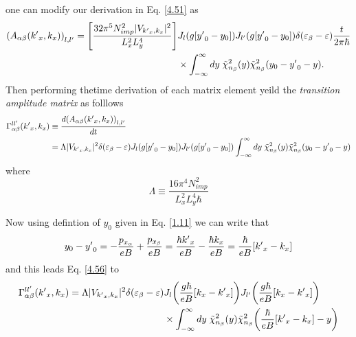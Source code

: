 one can modify our derivation in Eq. \eqref{4.51} as
\begin{equation} \label{4.54}
  \begin{aligned}
      \qty(A_{\alpha\beta}({k'}_x,k_x))_{l,l'} =
      \qty[\frac { 32\pi^5 N_{imp}^2 |V_{{k'}_x,k_x}|^2}{L_x^2 L_y^4}] &
      J_l\qty(g[{y'}_0 - y_0]) J_{l'}\qty(g[{y'}_0 - y_0])
      \delta(\varepsilon_{\beta} - \varepsilon)
      \frac{t}{2\pi \hbar}\\
      & \times
      \int_{-\infty}^{\infty} dy \;
      \tilde{\chi}^2_{n_{\beta}}\qty(y)
      \tilde{\chi}^2_{n_{\beta}}\qty(y_0 - {y'}_0 - y).
  \end{aligned}
\end{equation}
Then performing thetime derivation of each matrix element yeild the \textit{transition amplitude matrix} as folllows
\begin{equation} \label{4.55}
  \begin{aligned}
    \Gamma_{\alpha\beta}^{ll'}({k'}_x,k_x) &  \equiv
    \frac{d \qty(A_{\alpha\beta}({k'}_x,k_x))_{l,l'}}{dt} \\
    & =
    \Lambda |V_{{k'}_x,k_x}|^2
    \delta(\varepsilon_{\beta} - \varepsilon)
    J_l\qty(g[{y'}_0 - y_0]) J_{l'}\qty(g[{y'}_0 - y_0])
    \int_{-\infty}^{\infty} dy \;
    \tilde{\chi}^2_{n_{\beta}}\qty(y)
    \tilde{\chi}^2_{n_{\beta}}\qty(y_0 - {y'}_0 - y)
  \end{aligned}
\end{equation}
where
\begin{equation} \label{4.56}
    \Lambda \equiv
    \frac { 16\pi^4 N_{imp}^2}{L_x^2 L_y^4 \hbar}
\end{equation}

\noindent
Now using defintion of $y_0$ given in Eq. \eqref{1.11} we can write that
\begin{equation} \label{4.57}
    y_0 - {y'}_0 =
    - \frac{p_{x_{\alpha}}}{eB} + \frac{p_{x_{\beta}}}{eB} =
    \frac{\hbar {k'}_x}{eB} - \frac{\hbar {k}_x}{eB} =
    \frac{\hbar}{eB} \qty[{k'}_x - {k}_x]
\end{equation}
and this leads Eq. \eqref{4.56} to
\begin{equation} \label{4.58}
  \begin{aligned}
    \Gamma_{\alpha\beta}^{ll'}({k'}_x,k_x) =
    \Lambda |V_{{k'}_x,k_x}|^2
    \delta(\varepsilon_{\beta} - \varepsilon) &
    J_l\qty(\frac{g\hbar}{eB}[{k}_x - {k'}_x])
    J_{l'}\qty(\frac{g\hbar}{eB}[{k}_x - {k'}_x]) \\
    & \times
    \int_{-\infty}^{\infty} dy \;
    \tilde{\chi}^2_{n_{\beta}}\qty(y)
    \tilde{\chi}^2_{n_{\beta}}\qty(\frac{\hbar}{eB} \qty[{k'}_x - {k}_x] - y)
  \end{aligned}
\end{equation}

